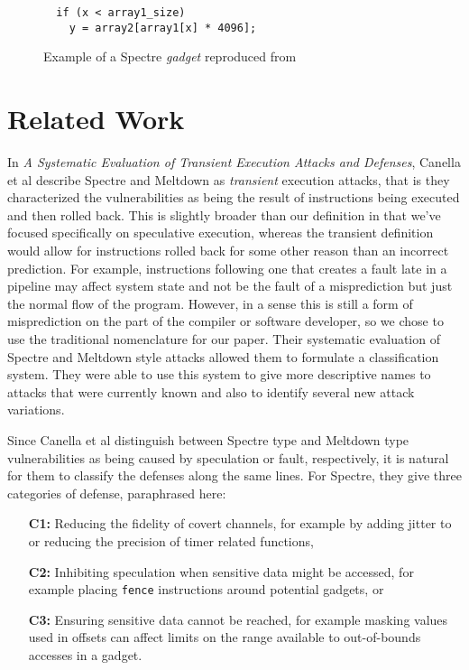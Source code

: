 \documentclass[11pt,conference]{IEEEtran}
\begin{document}
\begin{figure}[t]
  \begin{verbatim}
  if (x < array1_size)
    y = array2[array1[x] * 4096];\end{verbatim}
	\caption{Example of a Spectre \emph{gadget} reproduced from \cite{spectre}}
  \label{fig:gadget}
\end{figure}


\section{Related Work}\label{sec:related}
In \textit{A Systematic Evaluation of Transient Execution Attacks and Defenses}, Canella et al\cite{canella2019} describe Spectre and Meltdown as \emph{transient} execution attacks, that is they characterized the vulnerabilities as being the result of instructions being executed and then rolled back.
This is slightly broader than our definition in that we've focused specifically on speculative execution, whereas the transient definition would allow for instructions rolled back for some other reason than an incorrect prediction.
For example, instructions following one that creates a fault late in a pipeline may affect system state and not be the fault of a misprediction but just the normal flow of the program.
However, in a sense this is still a form of misprediction on the part of the compiler or software developer, so we chose to use the traditional nomenclature for our paper.
Their systematic evaluation of Spectre and Meltdown style attacks allowed them to formulate a classification system.
They were able to use this system to give more descriptive names to attacks that were currently known and also to identify several new attack variations.

Since Canella et al distinguish between Spectre type and Meltdown type vulnerabilities as being caused by speculation or fault, respectively, it is natural for them to classify the defenses along the same lines.
For Spectre, they give three categories of defense, paraphrased here:
\begin{enumerate}
	\item[\textbf{C1:}] Reducing the fidelity of covert channels, for example by adding jitter to or reducing the precision of timer related functions,
	\item[\textbf{C2:}] Inhibiting speculation when sensitive data might be accessed, for example placing \texttt{fence} instructions around potential gadgets, or
	\item[\textbf{C3:}] Ensuring sensitive data cannot be reached, for example masking values used in offsets can affect limits on the range available to out-of-bounds accesses in a gadget.
\end{enumerate}
\end{document}
